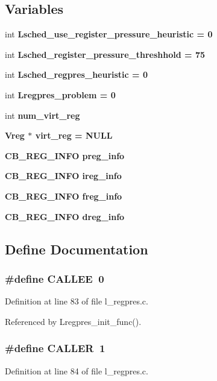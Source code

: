\subsection*{Variables}
\begin{CompactItemize}
\item 
int \bf{Lsched\_\-use\_\-register\_\-pressure\_\-heuristic} = 0
\item 
int \bf{Lsched\_\-register\_\-pressure\_\-threshhold} = 75
\item 
int \bf{Lsched\_\-regpres\_\-heuristic} = 0
\item 
int \bf{Lregpres\_\-problem} = 0
\item 
int \bf{num\_\-virt\_\-reg}
\item 
\bf{Vreg} $\ast$ \bf{virt\_\-reg} = \bf{NULL}
\item 
\bf{CB\_\-REG\_\-INFO} \bf{preg\_\-info}
\item 
\bf{CB\_\-REG\_\-INFO} \bf{ireg\_\-info}
\item 
\bf{CB\_\-REG\_\-INFO} \bf{freg\_\-info}
\item 
\bf{CB\_\-REG\_\-INFO} \bf{dreg\_\-info}
\end{CompactItemize}


\subsection{Define Documentation}
\subsubsection{\setlength{\rightskip}{0pt plus 5cm}\#define CALLEE~0}\label{l__regpres_8c_7a2ce10cbef56fc76d9d137d04ad19cd}




Definition at line 83 of file l\_\-regpres.c.

Referenced by Lregpres\_\-init\_\-func().
\subsubsection{\setlength{\rightskip}{0pt plus 5cm}\#define CALLER~1}\label{l__regpres_8c_7bf83495c4c1a47e4b5711455b0e29a4}




Definition at line 84 of file l\_\-regpres.c.

